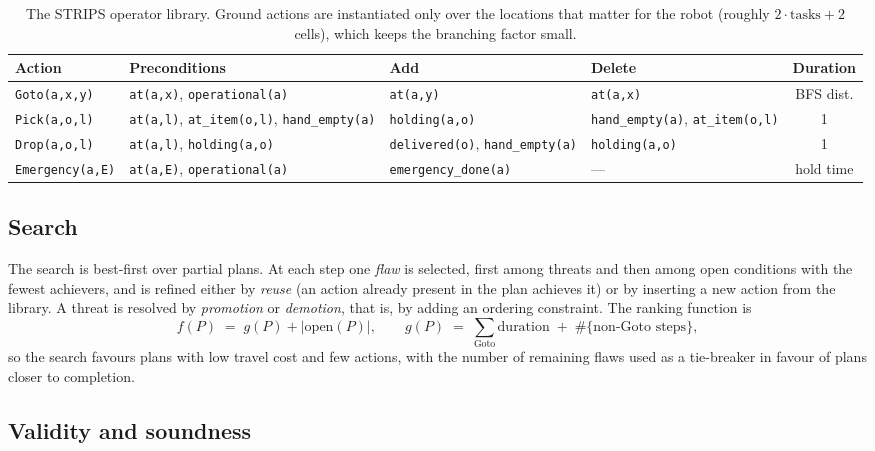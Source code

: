 \documentclass[10pt,a4paper]{article}
\newcommand{\code}[1]{\texttt{#1}}
\begin{document}
\begin{table}[H]
\centering
\small
\setlength{\tabcolsep}{4pt}
\begin{tabularx}{\textwidth}{@{}l X X X c@{}}
\toprule
\textbf{Action} & \textbf{Preconditions} & \textbf{Add} & \textbf{Delete} & \textbf{Duration}\\
\midrule
\code{Goto(a,x,y)} & \code{at(a,x)}, \code{operational(a)} & \code{at(a,y)} & \code{at(a,x)} & BFS dist.\\
\code{Pick(a,o,l)} & \code{at(a,l)}, \code{at\_item(o,l)}, \code{hand\_empty(a)} & \code{holding(a,o)} & \code{hand\_empty(a)}, \code{at\_item(o,l)} & 1\\
\code{Drop(a,o,l)} & \code{at(a,l)}, \code{holding(a,o)} & \code{delivered(o)}, \code{hand\_empty(a)} & \code{holding(a,o)} & 1\\
\code{Emergency(a,E)} & \code{at(a,E)}, \code{operational(a)} & \code{emergency\_done(a)} & --- & hold time\\
\bottomrule
\end{tabularx}
\caption{The STRIPS operator library.  Ground actions are instantiated only
over the locations that matter for the robot (roughly $2\cdot\text{tasks}+2$
cells), which keeps the branching factor small.}
\label{tab:strips}
\end{table}

\subsection{Search}

The search is best-first over partial plans.  At each step one \emph{flaw} is
selected, first among threats and then among open conditions with the fewest
achievers, and is refined either by \emph{reuse} (an action already present
in the plan achieves it) or by inserting a new action from the library.  A
threat is resolved by \emph{promotion} or \emph{demotion}, that is, by adding
an ordering constraint.  The ranking function is
%
\[
  f(P) \;=\; g(P) + \bigl|\text{open}(P)\bigr|,
  \qquad
  g(P) \;=\; \sum_{\text{Goto}} \text{duration} \;+\; \#\{\text{non-Goto steps}\},
\]
%
so the search favours plans with low travel cost and few actions, with the
number of remaining flaws used as a tie-breaker in favour of plans closer to
completion.

\subsection{Validity and soundness}
\end{document}
